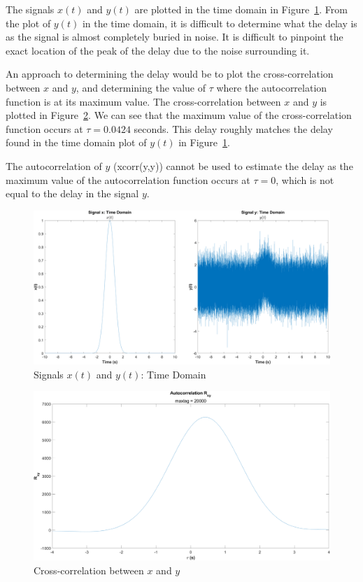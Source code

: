 \documentclass[12pt]{article}
\begin{document}
The signals $x(t)$ and $y(t)$ are plotted in the time domain in Figure~\ref{fig:exp3_time}. From the plot of $y(t)$ in the time domain, it is difficult to determine what the delay is as the signal is almost completely buried in noise. It is difficult to pinpoint the exact location of the peak of the delay due to the noise surrounding it.

An approach to determining the delay would be to plot the cross-correlation between $x$ and $y$, and determining the value of $\tau$ where the autocorrelation function is at its maximum value. The cross-correlation between $x$ and $y$ is plotted in Figure~\ref{fig:exp3_crosscorr}. We can see that the maximum value of the cross-correlation function occurs at $\tau = 0.0424$ seconds. This delay roughly matches the delay found in the time domain plot of $y(t)$ in Figure~\ref{fig:exp3_time}.

The autocorrelation of $y$ (xcorr(y,y)) cannot be used to estimate the delay as the maximum value of the autocorrelation function occurs at $\tau = 0$, which is not equal to the delay in the signal $y$.

\begin{figure}[h]
	\centering
	\includegraphics[width=\textwidth]{exp3_time}
	\caption{\label{fig:exp3_time}Signals $x(t)$ and $y(t)$: Time Domain}
\end{figure}

\begin{figure}[h]
	\centering
	\includegraphics[width=\textwidth]{exp3_crosscorr}
	\caption{\label{fig:exp3_crosscorr}Cross-correlation between $x$ and $y$}
\end{figure}
\end{document}
